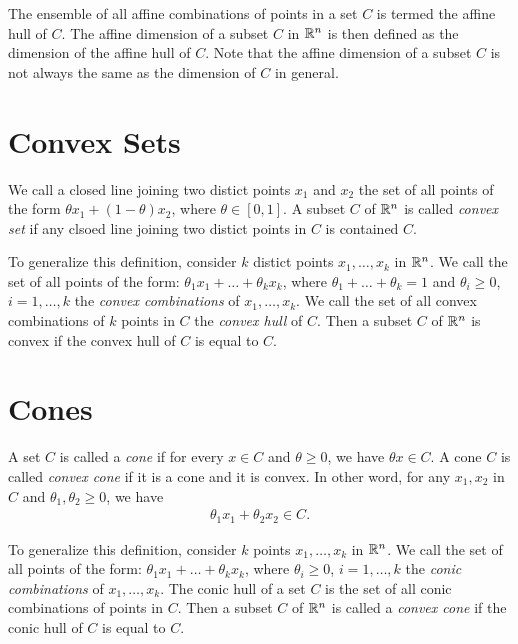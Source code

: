 \documentclass[a4paper, 12pt]{book}
\begin{document}
\begin{article}
    The ensemble of all affine combinations of points in a set $C$ is termed the affine hull of $C$. The affine dimension of a subset $C$ in $\mathbb{R}^n$ is then defined as the dimension of the affine hull of $C$. Note that the affine dimension of a subset $C$ is not always the same as the dimension of $C$ in general.
\end{article}

\section{Convex Sets}
\label{sec:convex_sets}

We call a closed line joining two distict points $x_1$ and $x_2$ the set of all points of the form $\theta x_1 + (1-\theta) x_2$, where $\theta \in [0, 1]$. A subset $C$ of $\mathbb{R}^n$ is called \emph{convex set} if any clsoed line joining two distict points in $C$ is contained $C$.

To generalize this definition, consider $k$ distict points $x_1, \dots, x_k$ in $\mathbb{R}^n$. We call the set of all points of the form: $\theta_1 x_1 + \dots + \theta_k x_k$, where $\theta_1 + \dots + \theta_k = 1$ and $\theta_i \geq 0$, $i = 1, \dots, k$ the \emph{convex combinations} of $x_1, \dots, x_k$. We call the set of all convex combinations of $k$ points in $C$ the \emph{convex hull} of $C$. Then a subset $C$ of $\mathbb{R}^n$ is convex if the convex hull of $C$ is equal to $C$.




\section{Cones}
\label{sec:cones}

A set $C$ is called a \emph{cone} if for every $x \in C$ and $\theta \geq 0$, we have $\theta x \in C$. A cone $C$ is called \emph{convex cone} if it is a cone and it is convex. In other word, for any $x_1, x_2$ in $C$ and $\theta_1, \theta_2 \geq 0$, we have
\begin{align*}
    \theta_1 x_1 + \theta_2 x_2 \in C.
\end{align*}

To generalize this definition, consider $k$ points $x_1, \dots, x_k$ in $\mathbb{R}^n$. We call the set of all points of the form: $\theta_1 x_1 + \dots + \theta_k x_k$, where $\theta_i \geq 0$, $i = 1, \dots, k$ the \emph{conic combinations} of $x_1, \dots, x_k$. The conic hull of a set $C$ is the set of all conic combinations of points in $C$. Then a subset $C$ of $\mathbb{R}^n$ is called a \emph{convex cone} if the conic hull of $C$ is equal to $C$.
\end{document}
